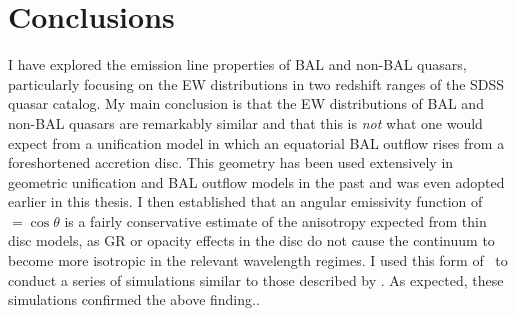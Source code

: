 

\section{Conclusions}
\label{sec:ew_conclusions}

I have explored the emission line properties of BAL and non-BAL quasars,
particularly focusing on the EW distributions in two redshift ranges of the SDSS
quasar catalog. My main conclusion is that the EW distributions of BAL and
non-BAL quasars are remarkably similar and that this is {\em not} what one would expect from
a unification model in which an equatorial BAL outflow rises from a foreshortened 
accretion disc. This geometry has been used extensively in 
geometric unification and BAL outflow models in the past 
\citep[e.g.][]{MCGV95,PSK2000,PK04,risalitielvis2010,borguet2010,
higginbottom2013, nomura2013,nomura2016} and was even adopted earlier in this thesis.
I then established that an angular emissivity function of \ept$ =\cos \theta$ 
is a fairly conservative estimate of the anisotropy expected from thin disc models, 
as GR or opacity effects in the disc do not cause the continuum to become more isotropic
in the relevant wavelength regimes. I used this form of \ept\ to conduct a series of simulations 
similar to those described by \cite{risaliti2011}.
As expected, these simulations confirmed the above finding..

